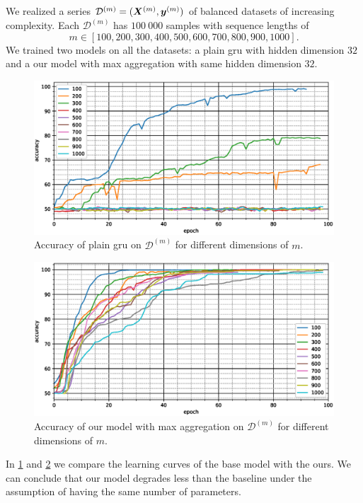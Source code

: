 We realized a series
$\mathcal{D}^{(m)}=(\bm{X}^{(m)},\bm{y}^{(m)})$ of balanced
datasets of increasing complexity. Each $\mathcal{D}^{(m)}$ has $100\ 000$
samples with 
sequence lengths of
$$
m\in[100,200,300,400,500,600,700,800,900,1000].$$
We trained two models on
all the datasets: a plain \ac{gru} with hidden dimension $32$ and a
our model with max aggregation with same hidden dimension $32$. 

\begin{figure}
  \centering
  \includegraphics[width=\floatwidth]{imgMax/accuracy-base.eps}
  \caption{Accuracy of plain \ac{gru} on $\mathcal{D}^{(m)}$ for different dimensions of $m$.}
  \label{fig:testAccBase}
\end{figure}

\begin{figure}
  \centering
  \includegraphics[width=\floatwidth]{imgMax/accuracy-max.eps}
  \caption{Accuracy of our model with max aggregation on $\mathcal{D}^{(m)}$ for different dimensions of $m$.}
  \label{fig:testAccMax}
\end{figure}

In \cref{fig:testAccBase} and \cref{fig:testAccMax} we compare
the learning curves of the base model with the ours. We can conclude
that our model degrades less than the baseline under the assumption of
having the same number of parameters.

